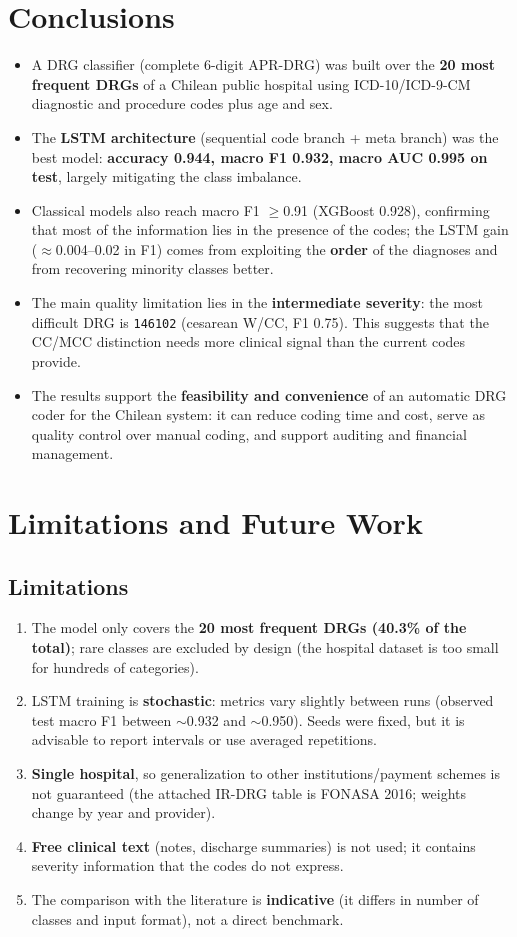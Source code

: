 \documentclass{ieeeaccess}
\begin{document}
\section{Conclusions}
\label{sec:conclusions}
\begin{itemize}
  \item A DRG classifier (complete 6-digit APR-DRG) was built over the \textbf{20 most frequent DRGs} of a Chilean public hospital using ICD-10/ICD-9-CM diagnostic and procedure codes plus age and sex.
  \item The \textbf{LSTM architecture} (sequential code branch + meta branch) was the best model: \textbf{accuracy 0.944, macro F1 0.932, macro AUC 0.995 on test}, largely mitigating the class imbalance.
  \item Classical models also reach macro F1 $\geq$0.91 (XGBoost 0.928), confirming that most of the information lies in the presence of the codes; the LSTM gain ($\approx$0.004--0.02 in F1) comes from exploiting the \textbf{order} of the diagnoses and from recovering minority classes better.
  \item The main quality limitation lies in the \textbf{intermediate severity}: the most difficult DRG is \texttt{146102} (cesarean W/CC, F1 0.75). This suggests that the CC/MCC distinction needs more clinical signal than the current codes provide.
  \item The results support the \textbf{feasibility and convenience} of an automatic DRG coder for the Chilean system: it can reduce coding time and cost, serve as quality control over manual coding, and support auditing and financial management.
\end{itemize}

\section{Limitations and Future Work}
\label{sec:limitations}
\subsection{Limitations}
\begin{enumerate}
  \item The model only covers the \textbf{20 most frequent DRGs (40.3\% of the total)}; rare classes are excluded by design (the hospital dataset is too small for hundreds of categories).
  \item LSTM training is \textbf{stochastic}: metrics vary slightly between runs (observed test macro F1 between $\sim$0.932 and $\sim$0.950). Seeds were fixed, but it is advisable to report intervals or use averaged repetitions.
  \item \textbf{Single hospital}, so generalization to other institutions/payment schemes is not guaranteed (the attached IR-DRG table is FONASA 2016; weights change by year and provider).
  \item \textbf{Free clinical text} (notes, discharge summaries) is not used; it contains severity information that the codes do not express.
  \item The comparison with the literature is \textbf{indicative} (it differs in number of classes and input format), not a direct benchmark.
\end{enumerate}
\end{document}
